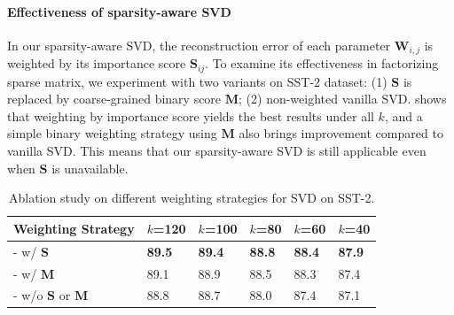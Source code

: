 \paragraph{Effectiveness of sparsity-aware SVD}
In our sparsity-aware SVD, the reconstruction error of each parameter $\bm{W}_{i,j}$ is weighted by its importance score $\bm{S}_{ij}$. To examine its effectiveness in factorizing sparse matrix, we experiment with two variants on SST-2 dataset: (1) $\bm{S}$ is replaced by coarse-grained binary score $\bm{M}$; (2) non-weighted vanilla SVD.  shows that weighting by importance score yields the best results under all $k$, and a simple binary weighting strategy using $\bm{M}$ also brings improvement compared to vanilla SVD. This means that our sparsity-aware SVD is still applicable even when $\bm{S}$ is unavailable.
\begin{table}[th]
	\centering
	\scriptsize
	\begin{tabular}{l|lllll}
		\toprule
		Weighting Strategy         &$k$=120  & $k$=100  & $k$=80   & $k$=60   & $k$=40   \\
		\midrule
		- w/ $\bm{S}$    &\textbf{89.5}  & \textbf{89.4} & \textbf{88.8} & \textbf{88.4} & \textbf{87.9} \\
		- w/ $\bm{M}$   &89.1   & 88.9 & 88.5 & 88.3 & 87.4 \\
		- w/o $\bm{S}$ or $\bm{M}$ &88.8 & 88.7 & 88.0 & 87.4 & 87.1 \\
		\bottomrule
	\end{tabular}
	\caption{Ablation study on different weighting strategies for SVD on SST-2.}
	\label{table:diffsvd}
\end{table}


